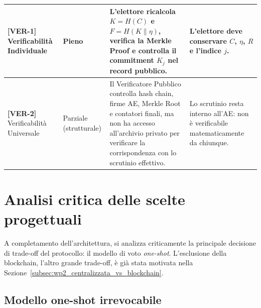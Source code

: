 \begin{longtable}{| p{2.4cm} | p{2.5cm} | p{5cm} | p{4.1cm} |}
    \textbf{[VER-1]} \newline Verificabilità Individuale
    & Pieno
    & L'elettore ricalcola $K = H(C)$ e $F = H(K \parallel \eta)$, verifica la Merkle Proof e controlla il commitment $K_j$ nel record pubblico.
    & L'elettore deve conservare $C$, $\eta$, $R$ e l'indice $j$. \\
    \hline

    \textbf{[VER-2]} \newline Verificabilità Universale
    & Parziale \newline (strutturale)
    & Il Verificatore Pubblico controlla hash chain, firme AE, Merkle Root e contatori finali, ma non ha accesso all'archivio privato per verificare la corrispondenza con lo scrutinio effettivo.
    & Lo scrutinio resta interno all'AE: non è verificabile matematicamente da chiunque. \\
    \hline

\end{longtable}


\section{Analisi critica delle scelte progettuali}
\label{sec:scelte_progettuali}

A completamento dell'architettura, si analizza criticamente la principale decisione di trade-off del protocollo: il modello di voto \textit{one-shot}. L'esclusione della blockchain, l'altro grande trade-off, è già stata motivata nella Sezione~\ref{subsec:wp2_centralizzata_vs_blockchain}.

\subsection{Modello one-shot irrevocabile}
\label{subsec:wp2_one_shot_irrevocabile}

